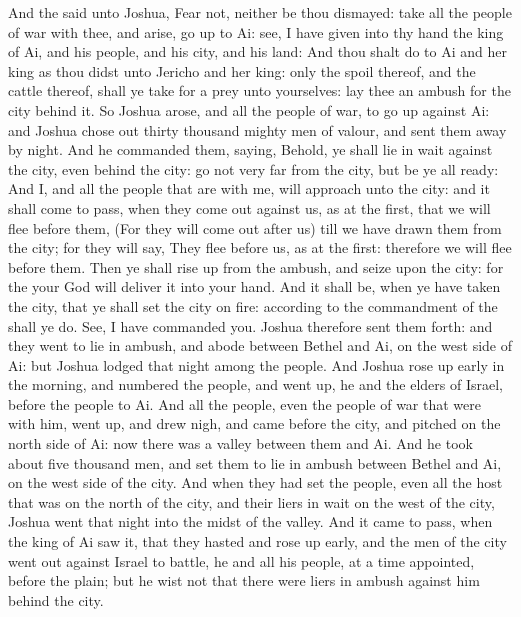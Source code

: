 \begin{biblechapter} %
 And the \LORD said unto Joshua, Fear not, neither be thou dismayed: take all the people of war with thee, and arise, go up to Ai: see, I have given into thy hand the king of Ai, and his people, and his city, and his land:
\verse And thou shalt do to Ai and her king as thou didst unto Jericho and her king: only the spoil thereof, and the cattle thereof, shall ye take for a prey unto yourselves: lay thee an ambush for the city behind it.
\verse So Joshua arose, and all the people of war, to go up against Ai: and Joshua chose out thirty thousand mighty men of valour, and sent them away by night.
\verse And he commanded them, saying, Behold, ye shall lie in wait against the city, even behind the city: go not very far from the city, but be ye all ready:
\verse And I, and all the people that are with me, will approach unto the city: and it shall come to pass, when they come out against us, as at the first, that we will flee before them,
\verse (For they will come out after us) till we have drawn them from the city; for they will say, They flee before us, as at the first: therefore we will flee before them.
\verse Then ye shall rise up from the ambush, and seize upon the city: for the \LORD your God will deliver it into your hand.
\verse And it shall be, when ye have taken the city, that ye shall set the city on fire: according to the commandment of the \LORD shall ye do. See, I have commanded you.
\verse Joshua therefore sent them forth: and they went to lie in ambush, and abode between Bethel and Ai, on the west side of Ai: but Joshua lodged that night among the people.
\verse And Joshua rose up early in the morning, and numbered the people, and went up, he and the elders of Israel, before the people to Ai.
\verse And all the people, even the people of war that were with him, went up, and drew nigh, and came before the city, and pitched on the north side of Ai: now there was a valley between them and Ai.
\verse And he took about five thousand men, and set them to lie in ambush between Bethel and Ai, on the west side of the city.
\verse And when they had set the people, even all the host that was on the north of the city, and their liers in wait on the west of the city, Joshua went that night into the midst of the valley.
\verse And it came to pass, when the king of Ai saw it, that they hasted and rose up early, and the men of the city went out against Israel to battle, he and all his people, at a time appointed, before the plain; but he wist not that there were liers in ambush against him behind the city.

\end{biblechapter}
